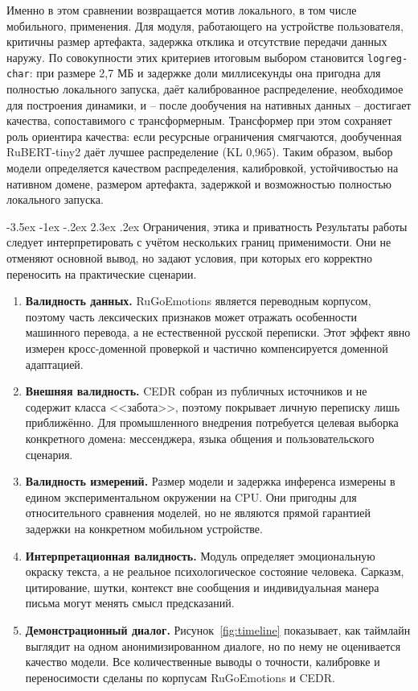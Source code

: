 \documentclass[12pt,a4paper]{report}
\makeatletter
\renewcommand{\section}{\@startsection{section}{1}{\z@}%
  {-3.5ex \@plus -1ex \@minus -.2ex}%
  {2.3ex \@plus .2ex}%
  {\normalfont\large\bfseries\centering}}
\makeatother
\begin{document}
Именно в этом сравнении возвращается мотив локального, в том числе мобильного, применения. Для модуля, работающего на устройстве пользователя, критичны размер артефакта, задержка отклика и отсутствие передачи данных наружу. По совокупности этих критериев итоговым выбором становится \texttt{logreg-char}: при размере 2{,}7 МБ и задержке доли миллисекунды она пригодна для полностью локального запуска, даёт калиброванное распределение, необходимое для построения динамики, и -- после дообучения на нативных данных -- достигает качества, сопоставимого с трансформерным. Трансформер при этом сохраняет роль ориентира качества: если ресурсные ограничения смягчаются, дообученная RuBERT-tiny2 даёт лучшее распределение (KL 0{,}965). Таким образом, выбор модели определяется качеством распределения, калибровкой, устойчивостью на нативном домене, размером артефакта, задержкой и возможностью полностью локального запуска.

\section{Ограничения, этика и приватность}
Результаты работы следует интерпретировать с учётом нескольких границ применимости. Они не отменяют основной вывод, но задают условия, при которых его корректно переносить на практические сценарии.
\begin{enumerate}
  \item \textbf{Валидность данных.} RuGoEmotions является переводным корпусом, поэтому часть лексических признаков может отражать особенности машинного перевода, а не естественной русской переписки. Этот эффект явно измерен кросс-доменной проверкой и частично компенсируется доменной адаптацией.
  \item \textbf{Внешняя валидность.} CEDR собран из публичных источников и не содержит класса <<забота>>, поэтому покрывает личную переписку лишь приближённо. Для промышленного внедрения потребуется целевая выборка конкретного домена: мессенджера, языка общения и пользовательского сценария.
  \item \textbf{Валидность измерений.} Размер модели и задержка инференса измерены в едином экспериментальном окружении на CPU. Они пригодны для относительного сравнения моделей, но не являются прямой гарантией задержки на конкретном мобильном устройстве.
  \item \textbf{Интерпретационная валидность.} Модуль определяет эмоциональную окраску текста, а не реальное психологическое состояние человека. Сарказм, цитирование, шутки, контекст вне сообщения и индивидуальная манера письма могут менять смысл предсказаний.
  \item \textbf{Демонстрационный диалог.} Рисунок~\ref{fig:timeline} показывает, как таймлайн выглядит на одном анонимизированном диалоге, но по нему не оценивается качество модели. Все количественные выводы о точности, калибровке и переносимости сделаны по корпусам RuGoEmotions и CEDR.
\end{enumerate}
\end{document}
